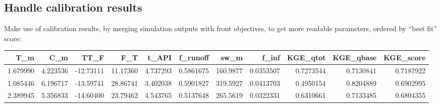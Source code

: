 \documentclass[
]{book}
\newenvironment{Shaded}{\begin{snugshade}}{\end{snugshade}}
\newcommand{\AttributeTok}[1]{\textcolor[rgb]{0.13,0.29,0.53}{#1}}
\newcommand{\CommentTok}[1]{\textcolor[rgb]{0.56,0.35,0.01}{\textit{#1}}}
\newcommand{\ConstantTok}[1]{\textcolor[rgb]{0.56,0.35,0.01}{#1}}
\newcommand{\DecValTok}[1]{\textcolor[rgb]{0.00,0.00,0.81}{#1}}
\newcommand{\FloatTok}[1]{\textcolor[rgb]{0.00,0.00,0.81}{#1}}
\newcommand{\FunctionTok}[1]{\textcolor[rgb]{0.13,0.29,0.53}{\textbf{#1}}}
\newcommand{\NormalTok}[1]{#1}
\newcommand{\OtherTok}[1]{\textcolor[rgb]{0.56,0.35,0.01}{#1}}
\newcommand{\SpecialCharTok}[1]{\textcolor[rgb]{0.81,0.36,0.00}{\textbf{#1}}}
\newcommand{\StringTok}[1]{\textcolor[rgb]{0.31,0.60,0.02}{#1}}
\begin{document}
\hypertarget{handle-calibration-results}{%
\subsection{Handle calibration results}\label{handle-calibration-results}}

Make use of calibration results, by merging simulation outputs with front objectives, to get more readable parameters, ordered by ``best fit'' score:

\begin{Shaded}
\end{Shaded}

\begin{tabular}{r|r|r|r|r|r|r|r|r|r|r}
\hline
T\_m & C\_m & TT\_F & F\_T & t\_API & f\_runoff & sw\_m & f\_inf & KGE\_qtot & KGE\_qbase & KGE\_score\\
\hline
1.679990 & 4.223536 & -12.73111 & 11.17360 & 4.737293 & 0.5861675 & 160.9877 & 0.0353507 & 0.7273544 & 0.7130841 & 0.7187922\\
\hline
1.085446 & 6.196717 & -13.59741 & 28.86741 & 3.402038 & 0.5901827 & 319.5927 & 0.0413703 & 0.4950154 & 0.8204889 & 0.6902995\\
\hline
2.389945 & 5.356833 & -14.60400 & 23.79462 & 4.543765 & 0.5137648 & 265.5619 & 0.0322331 & 0.6310661 & 0.7133485 & 0.6804355\\
\hline
\end{tabular}
\end{document}
